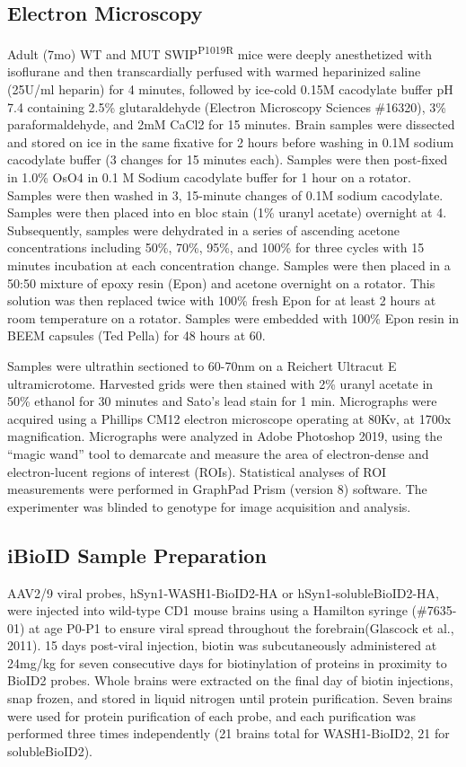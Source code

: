 \subsection{Electron Microscopy}

Adult (7mo) WT and MUT SWIP\textsuperscript{P1019R} mice were deeply
anesthetized with isoflurane and then transcardially perfused with warmed
heparinized saline (25U/ml heparin) for 4 minutes, followed by ice-cold 0.15M
cacodylate buffer pH 7.4 containing 2.5\% glutaraldehyde (Electron Microscopy
Sciences \#16320), 3\% paraformaldehyde, and 2mM CaCl2 for 15 minutes. Brain
samples were dissected and stored on ice in the same fixative for 2 hours before
washing in 0.1M sodium cacodylate buffer (3 changes for 15 minutes each).
Samples were then post-fixed in 1.0\% OsO4 in 0.1 M Sodium cacodylate buffer for
1 hour on a rotator. Samples were then washed in 3, 15-minute changes of 0.1M
sodium cacodylate. Samples were then placed into en bloc stain (1\% uranyl
acetate) overnight at 4\celsius. Subsequently, samples were dehydrated in a
series of ascending acetone concentrations including 50\%, 70\%, 95\%, and 100\%
for three cycles with 15 minutes incubation at each concentration change.
Samples were then placed in a 50:50 mixture of epoxy resin (Epon) and acetone
overnight on a rotator. This solution was then replaced twice with 100\% fresh
Epon for at least 2 hours at room temperature on a rotator. Samples were
embedded with 100\% Epon resin in BEEM capsules (Ted Pella) for 48 hours at
60\celsius.

Samples were ultrathin sectioned to 60-70nm on a Reichert
Ultracut E ultramicrotome. Harvested grids were then stained with 2\% uranyl
acetate in 50\% ethanol for 30 minutes and Sato’s lead stain for 1 min.
Micrographs were acquired using a Phillips CM12 electron microscope operating at
80Kv, at 1700x magnification. Micrographs were analyzed in Adobe Photoshop 2019,
using the “magic wand” tool to demarcate and measure the area of electron-dense
and electron-lucent regions of interest (ROIs). Statistical analyses of ROI
measurements were performed in GraphPad Prism (version 8) software. The
experimenter was blinded to genotype for image acquisition and analysis. 

\subsection{iBioID Sample Preparation}

AAV2/9 viral probes, hSyn1-WASH1-BioID2-HA or hSyn1-solubleBioID2-HA, were
injected into wild-type CD1 mouse brains using a Hamilton syringe (\#7635-01) at
age P0-P1 to ensure viral spread throughout the forebrain(Glascock et al.,
2011). 15 days post-viral injection, biotin was subcutaneously administered at
24mg/kg for seven consecutive days for biotinylation of proteins in proximity to
BioID2 probes. Whole brains were extracted on the final day of biotin
injections, snap frozen, and stored in liquid nitrogen until protein
purification. Seven brains were used for protein purification of each probe, and
each purification was performed three times independently (21 brains total for
WASH1-BioID2, 21 for solubleBioID2).

